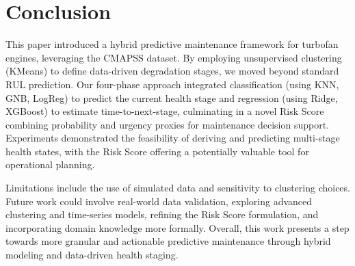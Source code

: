 \section{Conclusion}
\label{sec:conclusion}

This paper introduced a hybrid predictive maintenance framework for turbofan engines, leveraging the CMAPSS dataset. By employing unsupervised clustering (KMeans) to define data-driven degradation stages, we moved beyond standard RUL prediction. Our four-phase approach integrated classification (using KNN, GNB, LogReg) to predict the current health stage and regression (using Ridge, XGBoost) to estimate time-to-next-stage, culminating in a novel Risk Score combining probability and urgency proxies for maintenance decision support. Experiments demonstrated the feasibility of deriving and predicting multi-stage health states, with the Risk Score offering a potentially valuable tool for operational planning.

Limitations include the use of simulated data and sensitivity to clustering choices. Future work could involve real-world data validation, exploring advanced clustering and time-series models, refining the Risk Score formulation, and incorporating domain knowledge more formally. Overall, this work presents a step towards more granular and actionable predictive maintenance through hybrid modeling and data-driven health staging.
